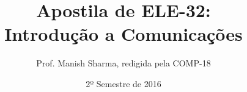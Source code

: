 \documentclass[12pt]{book}
\begin{document}
\pagestyle{empty}
\title{\textbf{Apostila de ELE-32:\\Introdução a Comunicações}}
\author{Prof. Manish Sharma, redigida pela COMP-18}
\date{2º Semestre de 2016}




\maketitle






\pagestyle{fancy}
\fancyhf{}
\fancyhead[RO,LE]{\thepage}
\fancyhead[LO]{\leftmark}
\fancyhead[RE]{\rightmark}
\renewcommand{\chaptermark}[1]{ \markboth{\chaptername\ \thechapter:\ #1}{} }
\renewcommand{\sectionmark}[1]{ \markright{#1}{} }






\end{document}
